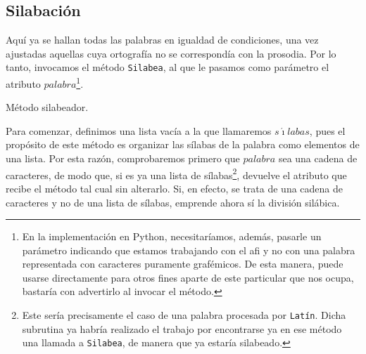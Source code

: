 \subsection{Silabación}
Aquí ya se hallan todas las palabras en igualdad de condiciones, una vez ajustadas aquellas cuya ortografía no se correspondía con la prosodia. Por lo tanto, invocamos el método \texttt{Silabea}, al que le pasamos como parámetro el atributo $palabra$\footnote{En la implementación en Python, necesitaríamos, además, pasarle un parámetro indicando que estamos trabajando con el \ac{afi} y no con una palabra representada con caracteres puramente grafémicos. De esta manera, puede usarse directamente para otros fines aparte de este particular que nos ocupa, bastaría con advertirlo al invocar el método.}.

\begin{algorithm}[!ht] %
	\caption{Método silabeador.}\label{list:metodosilabeador}
\end{algorithm}

Para comenzar, definimos  una lista vacía a la que llamaremos $s\acute{\imath}labas$, pues el propósito de este método es organizar las sílabas de la palabra como elementos de una lista. Por esta razón, comprobaremos primero que $palabra$ sea una cadena de caracteres, de modo que, si es ya una lista de sílabas\footnote{Este sería precisamente el caso de una palabra procesada por \texttt{Latín}. Dicha subrutina ya habría realizado el trabajo por encontrarse ya en ese método una llamada a \texttt{Silabea}, de manera que ya estaría silabeado.}, devuelve el atributo que recibe el método tal cual sin alterarlo. Si, en efecto, se trata de una cadena de caracteres y no de una lista de sílabas, emprende ahora sí la división silábica.

